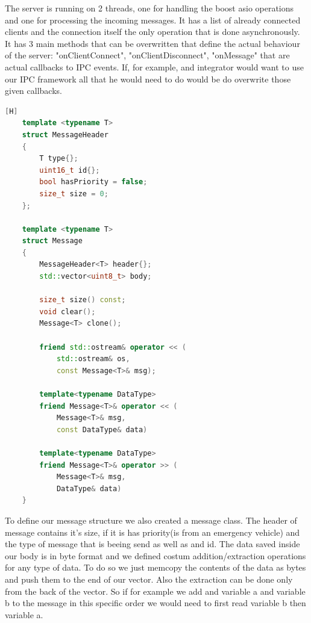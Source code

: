 \documentclass[17pt]{report}
\begin{document}
The server is running on 2 threads, one for handling the boost asio 
operations and one for processing the incoming messages. It has 
a list of already connected clients and the connection itself the only 
operation that is done asynchronously. It has 3 main methods that 
can be overwritten that define the actual behaviour of the server: 
"onClientConnect", "onClientDisconnect", "onMessage" that are actual 
callbacks to IPC events. If, for example, and integrator would want 
to use our IPC framework all that he would need to do would be do 
overwrite those given callbacks.

\pagebreak

\begin{lstlisting}[caption={Message template}, language = C++][H]
    template <typename T>
    struct MessageHeader
    {
        T type{};
        uint16_t id{};
        bool hasPriority = false;
        size_t size = 0;
    };
    
    template <typename T>
    struct Message
    {
        MessageHeader<T> header{};
        std::vector<uint8_t> body;

        size_t size() const;
        void clear();
        Message<T> clone();

        friend std::ostream& operator << (
            std::ostream& os, 
            const Message<T>& msg);

        template<typename DataType>
        friend Message<T>& operator << (
            Message<T>& msg,
            const DataType& data)
        
        template<typename DataType>
        friend Message<T>& operator >> (
            Message<T>& msg,
            DataType& data)
    }
\end{lstlisting}  

To define our message structure we also created a message class. The 
header of message contains it's size, if it is has priority(is from 
an emergency vehicle) and the type of message that is beeing send as
well as and id. The data saved inside our body is in byte format and 
we defined costum addition/extraction operations for any type of data.
To do so we just memcopy the contents of the data as bytes and push 
them to the end of our vector. Also the extraction can be done only 
from the back of the vector. So if for example we add and variable 
a and variable b to the message in this specific order we would need 
to first read variable b then variable a.
\pagebreak
\end{document}
